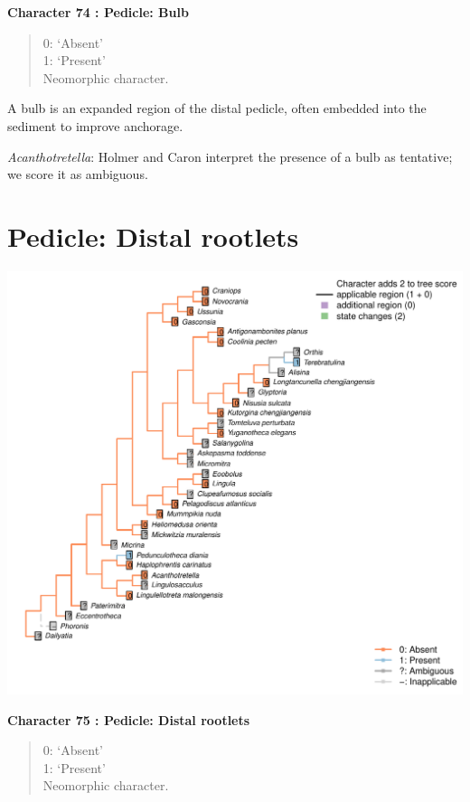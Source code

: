 \documentclass[]{book}
\theoremstyle{definition}
\theoremstyle{definition}
\theoremstyle{definition}
\theoremstyle{remark}
\begin{document}
\textbf{Character 74 : Pedicle: Bulb }

\begin{quote}
0: `Absent'\\
1: `Present'\\
Neomorphic character.
\end{quote}

A bulb is an expanded region of the distal pedicle, often embedded into
the sediment to improve anchorage.

\emph{Acanthotretella}: Holmer and Caron interpret the presence of a
bulb as tentative; we score it as ambiguous.

\hypertarget{pedicle-distal-rootlets}{%
\section*{Pedicle: Distal rootlets}\label{pedicle-distal-rootlets}}

\includegraphics{Brachiopod_phylogeny_files/figure-latex/unnamed-chunk-5-75.pdf}

\textbf{Character 75 : Pedicle: Distal rootlets }

\begin{quote}
0: `Absent'\\
1: `Present'\\
Neomorphic character.
\end{quote}
\end{document}
